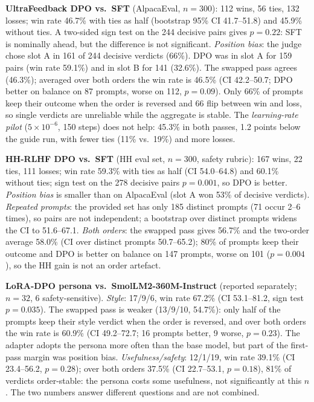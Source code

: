\documentclass[10pt]{article}
\begin{document}
\textbf{UltraFeedback DPO vs.\ SFT} (AlpacaEval, $n=300$): 112 wins, 56 ties, 132 losses; win rate 46.7\% with ties
as half (bootstrap 95\% CI 41.7--51.8) and 45.9\% without ties. A two-sided sign test on the 244 decisive pairs gives
$p=0.22$: SFT is nominally ahead, but the difference is not significant. \emph{Position bias}: the judge chose slot A
in 161 of 244 decisive verdicts (66\%). DPO was in slot A for 159 pairs (win rate 59.1\%) and in slot B for 141
(32.6\%). The swapped pass agrees (46.3\%); averaged over both orders the win rate is 46.5\% (CI 42.2--50.7; DPO
better on balance on 87 prompts, worse on 112, $p=0.09$). Only 66\% of prompts keep their outcome when the order is
reversed and 66 flip between win and loss, so single verdicts are unreliable while the aggregate is stable.
The \emph{learning-rate pilot} ($5{\times}10^{-6}$, 150 steps) does not help: 45.3\% in both passes, 1.2 points
below the guide run, with fewer ties (11\% vs.\ 19\%) and more losses.

\textbf{HH-RLHF DPO vs.\ SFT} (HH eval set, $n=300$, safety rubric): 167 wins, 22 ties, 111 losses; win rate 59.3\%
with ties as half (CI 54.0--64.8) and 60.1\% without ties; sign test on the 278 decisive pairs $p=0.001$, so DPO is
better. \emph{Position bias} is smaller than on AlpacaEval (slot A won 53\% of decisive verdicts). \emph{Repeated prompts}: the provided set has only
185 distinct prompts (71 occur 2--6 times), so pairs are not independent; a bootstrap over distinct prompts widens
the CI to 51.6--67.1. \emph{Both orders}: the swapped pass gives 56.7\% and the two-order average 58.0\% (CI over
distinct prompts 50.7--65.2); 80\% of prompts keep their outcome and DPO is better on balance on 147 prompts, worse
on 101 ($p=0.004$), so the HH gain is not an order artefact.

\textbf{LoRA-DPO persona vs.\ SmolLM2-360M-Instruct} (reported separately; $n=32$, 6 safety-sensitive). \emph{Style}:
17/9/6, win rate 67.2\% (CI 53.1--81.2, sign test $p=0.035$). The swapped pass is weaker (13/9/10, 54.7\%): only
half of the prompts keep their style verdict when the order is reversed, and over both orders the win rate is
60.9\% (CI 49.2--72.7; 16 prompts better, 9 worse, $p=0.23$). The adapter adopts the persona more often than the base
model, but part of the first-pass margin was position bias. \emph{Usefulness/safety}: 12/1/19, win rate 39.1\% (CI
23.4--56.2, $p=0.28$); over both orders 37.5\% (CI 22.7--53.1, $p=0.18$), 81\% of verdicts order-stable: the persona
costs some usefulness, not significantly at this $n$. The two numbers answer different questions and are not combined.
\end{document}
